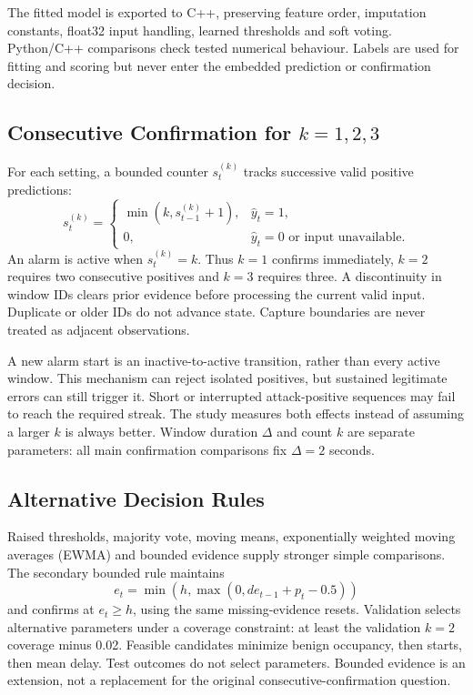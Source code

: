\documentclass[conference]{IEEEtran}
\begin{document}
The fitted model is exported to C++, preserving feature order,
imputation constants, float32 input handling, learned thresholds and
soft voting. Python/C++ comparisons check tested numerical behaviour.
Labels are used for fitting and scoring but never enter the embedded
prediction or confirmation decision.

\subsection{Consecutive Confirmation for $k=1,2,3$}

For each setting, a bounded counter $s_t^{(k)}$ tracks successive valid
positive predictions:
\begin{equation}
s_t^{(k)}=\begin{cases}
\min(k,s_{t-1}^{(k)}+1),&\hat y_t=1,\\
0,&\hat y_t=0\text{ or input unavailable}.
\end{cases}
\end{equation}
An alarm is active when $s_t^{(k)}=k$. Thus $k=1$ confirms immediately,
$k=2$ requires two consecutive positives and $k=3$ requires three.
A discontinuity in window IDs clears prior evidence before processing
the current valid input. Duplicate or older IDs do not advance state.
Capture boundaries are never treated as adjacent observations.

A new alarm start is an inactive-to-active transition, rather than
every active window. This mechanism can reject isolated positives,
but sustained legitimate errors can still trigger it. Short or
interrupted attack-positive sequences may fail to reach the required
streak. The study measures both effects instead of assuming a larger
$k$ is always better. Window duration $\Delta$ and count $k$ are separate
parameters: all main confirmation comparisons fix $\Delta=2$ seconds.

\subsection{Alternative Decision Rules}

Raised thresholds, majority vote, moving means, exponentially weighted
moving averages (EWMA) and bounded evidence supply stronger simple
comparisons. The secondary bounded rule maintains
\begin{equation}
e_t=\min\!\left(h,\max\!\left(0,d e_{t-1}+p_t-0.5\right)\right)
\end{equation}
and confirms at $e_t\geq h$, using the same missing-evidence resets.
Validation selects alternative parameters under a coverage constraint:
at least the validation $k=2$ coverage minus 0.02. Feasible candidates
minimize benign occupancy, then starts, then mean delay. Test outcomes
do not select parameters. Bounded evidence is an extension, not a
replacement for the original consecutive-confirmation question.
\end{document}
